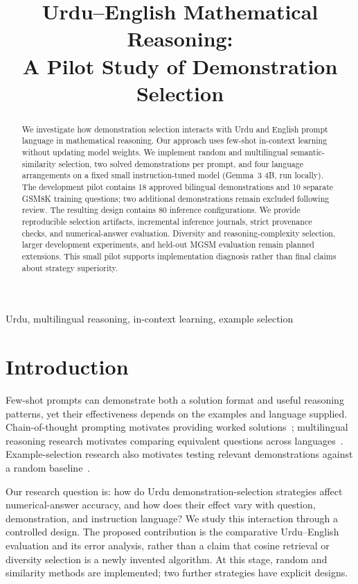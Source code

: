 \documentclass[conference]{IEEEtran}
\title{Urdu--English Mathematical Reasoning:\\A Pilot Study of Demonstration Selection}
\author{\IEEEauthorblockN{Ammar Anees, Hussain Baqar, Rayyan Hasib, and Saad ur Rehman}}
\begin{document}
\maketitle
\begin{abstract}
We investigate how demonstration selection interacts with Urdu and English prompt language in mathematical reasoning. Our approach uses few-shot in-context learning without updating model weights. We implement random and multilingual semantic-similarity selection, two solved demonstrations per prompt, and four language arrangements on a fixed small instruction-tuned model (Gemma~3 4B, run locally). The development pilot contains 18 approved bilingual demonstrations and 10 separate GSM8K training questions; two additional demonstrations remain excluded following review. The resulting design contains 80 inference configurations. We provide reproducible selection artifacts, incremental inference journals, strict provenance checks, and numerical-answer evaluation.  Diversity and reasoning-complexity selection, larger development experiments, and held-out MGSM evaluation remain planned extensions. This small pilot supports implementation diagnosis rather than final claims about strategy superiority.
\end{abstract}
\begin{IEEEkeywords}
Urdu, multilingual reasoning, in-context learning, example selection
\end{IEEEkeywords}

\section{Introduction}
Few-shot prompts can demonstrate both a solution format and useful reasoning patterns, yet their effectiveness depends on the examples and language supplied. Chain-of-thought prompting motivates providing worked solutions~\cite{wei}; multilingual reasoning research motivates comparing equivalent questions across languages~\cite{shi}. Example-selection research also motivates testing relevant demonstrations against a random baseline~\cite{liu}.

Our research question is: how do Urdu demonstration-selection strategies affect numerical-answer accuracy, and how does their effect vary with question, demonstration, and instruction language? We study this interaction through a controlled design. The proposed contribution is the comparative Urdu--English evaluation and its error analysis, rather than a claim that cosine retrieval or diversity selection is a newly invented algorithm. At this stage, random and similarity methods are implemented; two further strategies have explicit designs.
\end{document}
